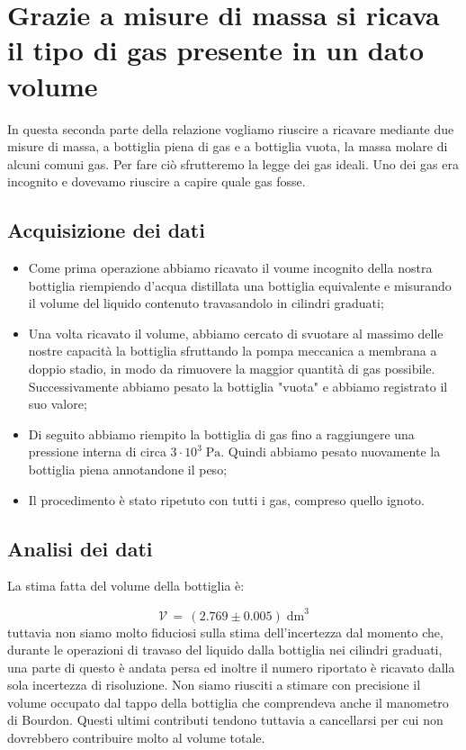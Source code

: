 \section{Grazie a misure di massa si ricava il tipo di gas presente in un dato volume}   

In questa seconda parte della relazione vogliamo riuscire a ricavare mediante due misure di massa,
a bottiglia piena di gas e a bottiglia vuota, la massa molare di alcuni comuni gas. Per fare ciò
sfrutteremo la legge dei gas ideali. Uno dei gas era incognito e dovevamo riuscire a capire quale gas fosse.

\subsection{Acquisizione dei dati}

\begin{itemize}
	\item{Come prima operazione abbiamo ricavato il voume incognito della nostra bottiglia riempiendo d'acqua distillata una bottiglia equivalente e misurando il volume del liquido contenuto travasandolo in cilindri graduati;}
	\item{Una volta ricavato il volume, abbiamo cercato di svuotare al massimo delle nostre capacità la bottiglia sfruttando la pompa meccanica a membrana a doppio stadio, in modo da rimuovere la maggior quantità di gas possibile. Successivamente abbiamo pesato la bottiglia "vuota" e abbiamo registrato il suo valore;}
	\item{Di seguito abbiamo riempito la bottiglia di gas fino a raggiungere una pressione interna di circa $3 \cdot 10^3 \; \si{\pascal}$. Quindi abbiamo pesato nuovamente la bottiglia piena annotandone il peso;}
	\item{Il procedimento è stato ripetuto con tutti i gas, compreso quello ignoto.}
\end{itemize}

\subsection{Analisi dei dati}

La stima fatta del volume della bottiglia è:

\begin{equation}
	\mathcal{V} \, = \, (2.769 \pm 0.005) \; \si{\deci\meter}^3  
\end{equation}
%
tuttavia non siamo molto fiduciosi sulla stima dell'incertezza dal momento che, durante le operazioni di
travaso del liquido dalla bottiglia nei cilindri graduati, una parte di questo è andata persa ed inoltre
il numero riportato è ricavato dalla sola incertezza di risoluzione.
Non siamo riusciti a stimare con precisione il volume occupato dal tappo della bottiglia che
comprendeva anche il manometro di Bourdon. Questi ultimi contributi tendono tuttavia a cancellarsi
per cui non dovrebbero contribuire molto al volume totale.%

